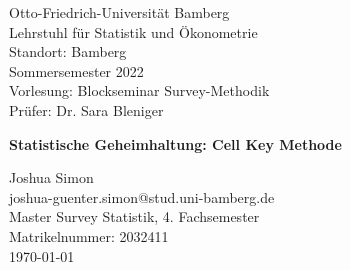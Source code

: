 

\thispagestyle{empty}%

{\raggedright%
Otto-Friedrich-Universität Bamberg\\%
Lehrstuhl für Statistik und Ökonometrie\\%
Standort: Bamberg\\%
Sommersemester 2022\\%
Vorlesung: Blockseminar Survey-Methodik\\%
Prüfer: Dr. Sara Bleniger\\%
}%

\vspace*{\fill}%
\begin{center}%
    \textbf{\Large{Statistische Geheimhaltung: Cell Key Methode}}%
\end{center}%
\vfill%

{%
\raggedleft%
Joshua Simon\\%
joshua-guenter.simon@stud.uni-bamberg.de\\%
Master Survey Statistik, 4. Fachsemester\\%
Matrikelnummer: 2032411\\%
\today\\}%


\newpage%

